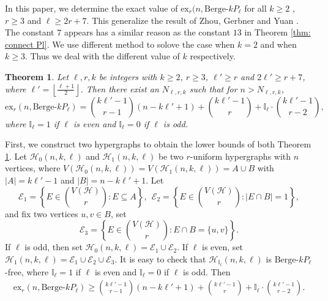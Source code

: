 \documentclass[12pt]{article}%
\newtheorem{theorem}{Theorem}[section]
\newcommand{\ber}{\text{Berge-}}
\newcommand{\mh}{\mathcal{H}}
\newcommand{\lf}{\left\lfloor}
\newcommand{\rf}{\right\rfloor}
\newcommand{\lchuto}{\lf\frac{\ell+1}{2}\rf}
\begin{document}
In this paper, we determine the exact value of $\mathrm{ex}_r(n,\ber kP_\ell$ for all $k\geq 2$ , $r\geq 3$ and $\ell\geq 2r+7.$ This generalize the result of Zhou, Gerbner and Yuan \cite{Zhou2025OnTP}. The constant $7$ appears has a similar reason as the constant $13$ in Theorem \ref{thm: connect Pl}. We use different method to solove the case when $k=2$ and when $k\geq 3$. Thus we deal with the different value of $k$ respectively.
\begin{theorem}\label{thm: berge linear forest} Let $\ell,r,k$ be integers with $k\geq 2$, $r\ge 3$, $\ell'\geq r$ and $2\ell'\geq r+7$, where $\ell'=\lchuto$.
Then    there exist an $N_{\ell,r,k}$ such that for $n>N_{\ell,r,k}$,
    $$\mathrm{ex}_r(n,\ber kP_{\ell})={k\ell'-1\choose r-1}(n-k\ell'+1)+{k\ell'-1\choose r}+\mathbb{I}_\ell\cdot{k\ell'-1\choose r-2},$$
    where  $\mathbb{I}_\ell=1$ if $\ell$ is even and $\mathbb{I}_\ell=0$ if $\ell$ is odd.
\end{theorem}


First, we construct two hypergraphs to obtain the lower bounds of both Theorem \ref{thm: berge linear forest}.
    Let $\mh_0(n,k,\ell)$ and $\mh_1(n,k,\ell)$ be two $r$-uniform hypergraphs with $n$ vertices,
where $V(\mh_0(n,k,\ell))=V(\mh_1(n,k,\ell))=A\cup B$  with  $|A|=k\ell'-1$ and $|B|=n-k\ell'+1$. %
 Let $$\mathcal{E}_1=\left\{E\in\binom{V(\mh)}{r}:E\subseteq A\right\},~~\mathcal{E}_2=\left\{E\in\binom{V(\mh)}{r}:|E\cap B|=1\right\},$$ and fix two vertices $u,v\in B$, set $$\mathcal{E}_3=\left\{E\in \binom{V(\mh)}{r}: E\cap B=\{u,v\} \right\}.$$
If $\ell$ is odd, then set $\mh_0(n,k,\ell)=\mathcal{E}_1\cup \mathcal{E}_2$. If $\ell$ is even, set $\mh_1(n,k,\ell)=\mathcal{E}_1\cup \mathcal{E}_2\cup \mathcal{E}_3$. It is easy to check that $\mh_{\mathbb{I}_{\ell}}(n,k,\ell)$ is $\ber kP_\ell$-free, where $\mathbb{I}_{\ell}=1$ if $\ell$ is even and $\mathbb{I}_{\ell}=0$ if $\ell$ is odd. Then%
\begin{align}\label{3-1}
\mathrm{ex}_r(n,\ber kP_{\ell})\ge {k\ell'-1\choose r-1}(n-k\ell'+1)+{k\ell'-1\choose r}+\mathbb{I}_\ell\cdot\binom{k\ell'-1}{r-2}.
\end{align}
\end{document}
